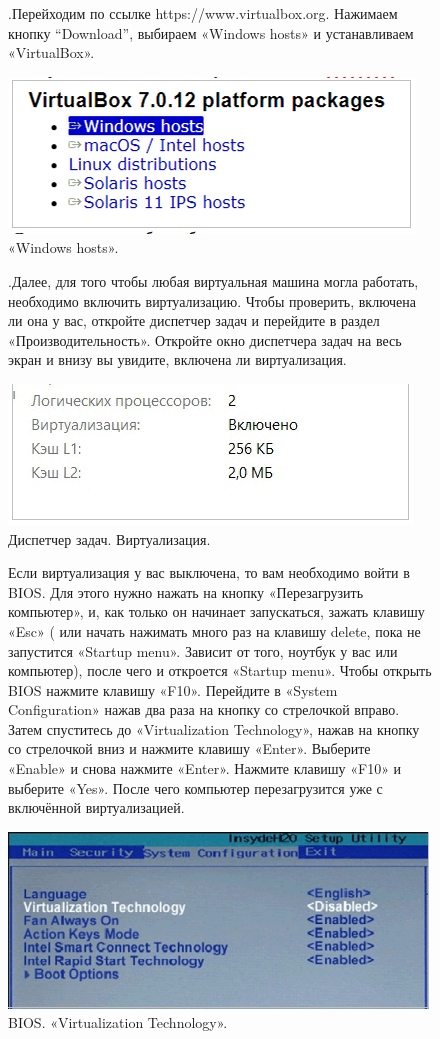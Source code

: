 \documentclass[oneside,final,12pt]{extarticle} %
\begin{document}
\begin{figure}
.\quad Перейходим по ссылке https://www.virtualbox.org. Нажимаем кнопку “Download”, выбираем «Windows hosts» и устанавливаем «VirtualBox». 
		
		\centering
		\includegraphics[width=0.65\linewidth]{img/1.png}
\caption{«Windows hosts».}
\label{ris:image}
\end{figure}

\begin{figure}
.\quad Далее, для того чтобы любая виртуальная машина могла работать, необходимо включить виртуализацию. Чтобы проверить, включена ли она у вас, откройте диспетчер задач и перейдите в раздел «Производительность». Откройте окно диспетчера задач на весь экран и внизу вы увидите, включена ли виртуализация.

		\centering
		\includegraphics[width=0.65\linewidth]{img/2.png}
\caption{Диспетчер задач. Виртуализация.}
\label{ris:image}
\end{figure}

\begin{figure}
\quad Если виртуализация у вас выключена, то вам необходимо войти в BIOS. Для этого нужно нажать на кнопку «Перезагрузить компьютер», и, как только он начинает запускаться, зажать клавишу «Esc» ( или начать нажимать много раз на клавишу delete, пока не запустится «Startup menu». Зависит от того, ноутбук у вас или компьютер), после чего и откроется «Startup menu». Чтобы открыть BIOS нажмите клавишу «F10». Перейдите в «System Configuration» нажав два раза на кнопку со стрелочкой вправо. Затем спуститесь до «Virtualization Technology», нажав на кнопку со стрелочкой вниз и нажмите клавишу «Enter». Выберите «Enable» и снова нажмите «Enter». Нажмите клавишу «F10» и выберите «Yes». После чего компьютер перезагрузится уже с включённой виртуализацией.

		\centering
		\includegraphics[width=0.65\linewidth]{img/3.png}
\caption{BIOS. «Virtualization Technology».}
\label{ris:image}
\end{figure}
\end{document}
